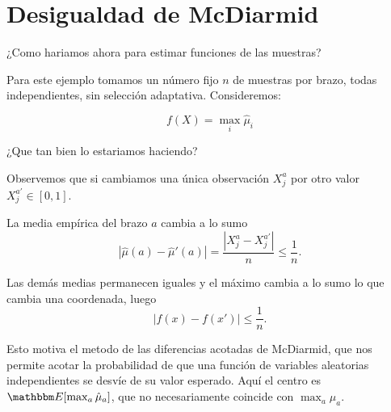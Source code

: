 \section{Desigualdad de McDiarmid}

¿Como hariamos ahora para estimar funciones de las muestras? 

Para este ejemplo tomamos un número fijo \(n\) de muestras por brazo, todas independientes, sin selección adaptativa. Consideremos:

\[
f(X) = \max_{i} \hat{\mu}_i
\]

¿Que tan bien lo estariamos haciendo?

Observemos que si cambiamos una única observación \(X_j^a\) por otro valor \(X_j^{a\prime}\in[0,1]\).

La media empírica del brazo \(a\) cambia a lo sumo
\[
|\hat\mu(a)-\hat\mu'(a)|
=
\frac{|X_j^a-X_j^{a\prime}|}{n}
\le\frac1n.
\]

Las demás medias permanecen iguales y el máximo cambia a lo sumo lo que cambia una coordenada, luego
\[
|f(x)-f(x')|\le\frac{1}{n}.
\]

Esto motiva el metodo de las diferencias acotadas de McDiarmid, que nos permite acotar la probabilidad de que una función de variables aleatorias independientes se desvíe de su valor esperado.
Aquí el centro es \(\E{\max_a\hat\mu_a}\), que no necesariamente coincide con \(\max_a\mu_a\).


